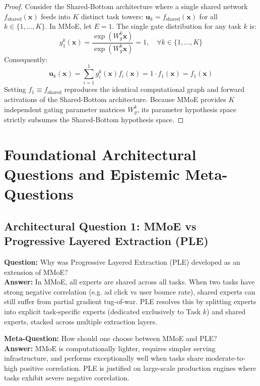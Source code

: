 \documentclass[11pt,a4paper]{article}
\theoremstyle{definition}
\begin{document}
\begin{proof}
Consider the Shared-Bottom architecture where a single shared network $f_{\text{shared}}(\mathbf{x})$ feeds into $K$ distinct task towers: $\mathbf{u}_k = f_{\text{shared}}(\mathbf{x})$ for all $k \in \{1, \dots, K\}$.
In MMoE, let $E = 1$.
The single gate distribution for any task $k$ is:
{\boldmath
\begin{equation}
g_1^k(\mathbf{x}) = \frac{\exp(W_g^k \mathbf{x})}{\exp(W_g^k \mathbf{x})} = 1, \quad \forall k \in \{1, \dots, K\}
\end{equation}
}
Consequently:
{\boldmath
\begin{equation}
\mathbf{u}_k(\mathbf{x}) = \sum_{i=1}^1 g_i^k(\mathbf{x}) f_i(\mathbf{x}) = 1 \cdot f_1(\mathbf{x}) = f_1(\mathbf{x})
\end{equation}
}
Setting $f_1 \equiv f_{\text{shared}}$ reproduces the identical computational graph and forward activations of the Shared-Bottom architecture.
Because MMoE provides $K$ independent gating parameter matrices $W_g^k$, its parameter hypothesis space strictly subsumes the Shared-Bottom hypothesis space.
\end{proof}

\section{Foundational Architectural Questions and Epistemic Meta-Questions}

\subsection{Architectural Question 1: MMoE vs Progressive Layered Extraction (PLE)}
\textbf{Question:} Why was Progressive Layered Extraction (PLE) developed as an extension of MMoE?\\
\textbf{Answer:} In MMoE, all experts are shared across all tasks. When two tasks have strong negative correlation (e.g. ad click vs user bounce rate), shared experts can still suffer from partial gradient tug-of-war. PLE resolves this by splitting experts into explicit task-specific experts (dedicated exclusively to Task $k$) and shared experts, stacked across multiple extraction layers.

\textbf{Meta-Question:} How should one choose between MMoE and PLE?\\
\textbf{Answer:} MMoE is computationally lighter, requires simpler serving infrastructure, and performs exceptionally well when tasks share moderate-to-high positive correlation. PLE is justified on large-scale production engines where tasks exhibit severe negative correlation.
\end{document}

